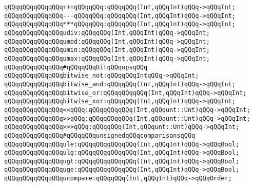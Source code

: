 \newline
\verb|qQQqqQQqqQQqqQQq+++qQQqqQQq:qQQqqQQq(Int,qQQqInt)qQQq->qQQqInt;|\newline
\verb|qQQqqQQqqQQqqQQq---qQQqqQQq:qQQqqQQq(Int,qQQqInt)qQQq->qQQqInt;|\newline
\verb|qQQqqQQqqQQqqQQq***qQQqqQQq:qQQqqQQq(Int,qQQqInt)qQQq->qQQqInt;|\newline
\verb|qQQqqQQqqQQqqQQqudiv:qQQqqQQq(Int,qQQqInt)qQQq->qQQqInt;|\newline
\verb|qQQqqQQqqQQqqQQqumod:qQQqqQQq(Int,qQQqInt)qQQq->qQQqInt;|\newline
\verb|qQQqqQQqqQQqqQQqumin:qQQqqQQq(Int,qQQqInt)qQQq->qQQqInt;|\newline
\verb|qQQqqQQqqQQqqQQqumax:qQQqqQQq(Int,qQQqInt)qQQq->qQQqInt;|\newline
\newline
\verb|qQQqqQQqqQQqqQQq#qQQqqQQqBitqQQqopsqQQq|\newline
\verb|qQQqqQQqqQQqqQQqbitwise_not:qQQqqQQqIntqQQq->qQQqInt;|\newline
\verb|qQQqqQQqqQQqqQQqbitwise_and:qQQqqQQq(Int,qQQqInt)qQQq->qQQqInt;|\newline
\verb|qQQqqQQqqQQqqQQqbitwise_or:qQQqqQQqqQQq(Int,qQQqInt)qQQq->qQQqInt;|\newline
\verb|qQQqqQQqqQQqqQQqbitwise_xor:qQQqqQQq(Int,qQQqInt)qQQq->qQQqInt;|\newline
\verb|qQQqqQQqqQQqqQQq<<qQQq:qQQqqQQqqQQq(Int,qQQqunt::Unt)qQQq->qQQqInt;|\newline
\verb|qQQqqQQqqQQqqQQq>>qQQq:qQQqqQQqqQQq(Int,qQQqunt::Unt)qQQq->qQQqInt;|\newline
\verb|qQQqqQQqqQQqqQQq>>>qQQq:qQQqqQQq(Int,qQQqunt::Unt)qQQq->qQQqInt;|\newline
\newline
\verb|qQQqqQQqqQQqqQQq#qQQqqQQqunsignedqQQqcomparisonsqQQq|\newline
\verb|qQQqqQQqqQQqqQQqule:qQQqqQQqqQQqqQQq(Int,qQQqInt)qQQq->qQQqBool;|\newline
\verb|qQQqqQQqqQQqqQQqulg:qQQqqQQqqQQqqQQq(Int,qQQqInt)qQQq->qQQqBool;|\newline
\verb|qQQqqQQqqQQqqQQqugt:qQQqqQQqqQQqqQQq(Int,qQQqInt)qQQq->qQQqBool;|\newline
\verb|qQQqqQQqqQQqqQQquge:qQQqqQQqqQQqqQQq(Int,qQQqInt)qQQq->qQQqBool;|\newline
\verb|qQQqqQQqqQQqqQQqucompare:qQQqqQQq(Int,qQQqInt)qQQq->qQQqOrder;|\newline
\newline
